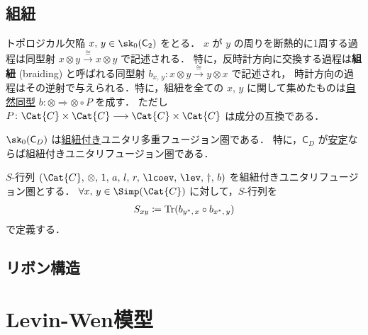 \documentclass[TQFT_main]{subfiles}
\begin{document}
\subsection{組紐}

トポロジカル欠陥 $x,\, y \in \sk_0(\mathsf{C}_2)$ をとる．
$x$ が $y$ の周りを断熱的に1周する過程は同型射 $x \otimes y \xrightarrow{\cong} x \otimes y$ で記述される．
特に，反時計方向に交換する過程は\textbf{組紐} (braiding) と呼ばれる同型射 $b_{x,\, y} \colon x \otimes y \xrightarrow{\cong} y \otimes x$ で記述され，
時計方向の過程はその逆射で与えられる．特に，組紐を全ての $x,\, y$ に関して集めたものは\hyperref[def:nat]{自然同型} $b \colon \otimes \Longrightarrow \otimes \circ P$ を成す．
ただし $P \colon \Cat{C} \times \Cat{C} \lto \Cat{C} \times \Cat{C}$ は成分の互換である．


\begin{mypropph}[label=prop:sk0-braided]{}
    $\sk_0(\mathsf{C}_D)$ は\hyperref[def:braided-monoidal]{組紐付き}ユニタリ多重フュージョン圏である．
    特に，$\mathsf{C}_D$ が\hyperref[def:stableTO]{安定}ならば組紐付きユニタリフュージョン圏である．
\end{mypropph}

\begin{mydef}[label=def:S-matrix]{$S$-行列}
    $(\Cat{C},\, \otimes,\, 1,\, a,\, l,\, r,\, \lcoev,\, \lev,\, \dagger,\,  b)$ を組紐付きユニタリフュージョン圏とする．
    $\forall x,\, y \in \Simp (\Cat{C})$ に対して，$S$-行列を
    \begin{align}
        S_{xy} \coloneqq \Tr (b_{y^*,\, x} \circ b_{x^*,\, y})
    \end{align}
    で定義する．
\end{mydef}

\subsection{リボン構造}


\section{Levin-Wen模型}
\end{document}
